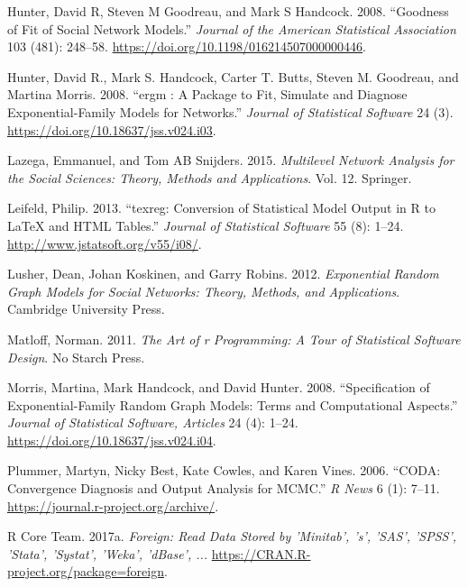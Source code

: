 \documentclass[
]{book}
\newlength{\cslhangindent}
\newlength{\cslentryspacingunit} %
\newenvironment{CSLReferences}[2] %
 {%
  \setlength{\parindent}{0pt}
  \ifodd #1
  \let\oldpar\par
  \def\par{\hangindent=\cslhangindent\oldpar}
  \fi
  \setlength{\parskip}{#2\cslentryspacingunit}
 }%
 {}
\begin{document}
\begin{CSLReferences}{1}{0}
\leavevmode{}%
Hunter, David R, Steven M Goodreau, and Mark S Handcock. 2008. {``Goodness of Fit of Social Network Models.''} \emph{Journal of the American Statistical Association} 103 (481): 248--58. \url{https://doi.org/10.1198/016214507000000446}.

\leavevmode{}%
Hunter, David R., Mark S. Handcock, Carter T. Butts, Steven M. Goodreau, and Martina Morris. 2008. {``{ergm : A Package to Fit, Simulate and Diagnose Exponential-Family Models for Networks}.''} \emph{Journal of Statistical Software} 24 (3). \url{https://doi.org/10.18637/jss.v024.i03}.

\leavevmode{}%
Lazega, Emmanuel, and Tom AB Snijders. 2015. \emph{Multilevel Network Analysis for the Social Sciences: Theory, Methods and Applications}. Vol. 12. Springer.

\leavevmode{}%
Leifeld, Philip. 2013. {``{texreg}: Conversion of Statistical Model Output in {R} to {LaTeX} and {HTML} Tables.''} \emph{Journal of Statistical Software} 55 (8): 1--24. \url{http://www.jstatsoft.org/v55/i08/}.

\leavevmode{}%
Lusher, Dean, Johan Koskinen, and Garry Robins. 2012. \emph{Exponential Random Graph Models for Social Networks: Theory, Methods, and Applications}. Cambridge University Press.

\leavevmode{}%
Matloff, Norman. 2011. \emph{The Art of r Programming: A Tour of Statistical Software Design}. No Starch Press.

\leavevmode{}%
Morris, Martina, Mark Handcock, and David Hunter. 2008. {``Specification of Exponential-Family Random Graph Models: Terms and Computational Aspects.''} \emph{Journal of Statistical Software, Articles} 24 (4): 1--24. \url{https://doi.org/10.18637/jss.v024.i04}.

\leavevmode{}%
Plummer, Martyn, Nicky Best, Kate Cowles, and Karen Vines. 2006. {``{CODA}: Convergence Diagnosis and Output Analysis for MCMC.''} \emph{R News} 6 (1): 7--11. \url{https://journal.r-project.org/archive/}.

\leavevmode{}%
R Core Team. 2017a. \emph{Foreign: Read Data Stored by 'Minitab', 's', 'SAS', 'SPSS', 'Stata', 'Systat', 'Weka', 'dBase', ...} \url{https://CRAN.R-project.org/package=foreign}.


\end{CSLReferences}
\end{document}
